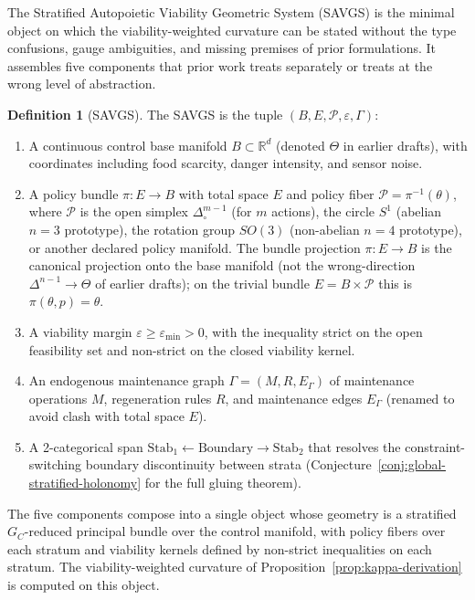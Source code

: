 \documentclass[11pt,a4paper]{article}
\theoremstyle{plain}
\theoremstyle{definition}
\newtheorem{definition}[theorem]{Definition}
\theoremstyle{remark}
\newcommand{\RR}{\mathbb{R}}
\newcommand{\Stab}{\mathrm{Stab}}
\begin{document}
The Stratified Autopoietic Viability Geometric System (SAVGS) is the
minimal object on which the viability-weighted curvature can be stated
without the type confusions, gauge ambiguities, and missing premises of
prior formulations. It assembles five components that prior work treats
separately or treats at the wrong level of abstraction.

\begin{definition}[SAVGS]
\label{def:savgs}
The SAVGS is the tuple $(B, E, \mathcal P, \varepsilon, \Gamma)$:
\begin{enumerate}[leftmargin=*,itemsep=2pt]
\item A continuous control base manifold $B \subset \RR^d$ (denoted
$\Theta$ in earlier drafts), with coordinates including food
scarcity, danger intensity, and sensor noise.
\item A policy bundle $\pi : E \to B$ with total space $E$ and policy
fiber $\mathcal P = \pi^{-1}(\theta)$, where $\mathcal P$ is the open
simplex $\Delta^{m-1}_\circ$ (for $m$ actions), the circle $S^1$
(abelian $n=3$ prototype), the rotation group $SO(3)$ (non-abelian
$n=4$ prototype), or another declared policy manifold. The bundle
projection $\pi : E \to B$ is the canonical projection onto the base
manifold (not the wrong-direction $\Delta^{n-1} \to \Theta$ of earlier
drafts); on the trivial bundle $E = B \times \mathcal P$ this is
$\pi(\theta, p) = \theta$.
\item A viability margin $\varepsilon\geq\varepsilon_{\min}>0$, with
the inequality strict on the open feasibility set and non-strict on the
closed viability kernel.
\item An endogenous maintenance graph $\Gamma=(M, R, E_\Gamma)$ of
maintenance operations $M$, regeneration rules $R$, and maintenance
edges $E_\Gamma$ (renamed to avoid clash with total space $E$).
\item A 2-categorical span $\Stab_1\leftarrow\mathrm{Boundary}\rightarrow
\Stab_2$ that resolves the constraint-switching boundary discontinuity
between strata (Conjecture~\ref{conj:global-stratified-holonomy} for
the full gluing theorem).
\end{enumerate}
\end{definition}

The five components compose into a single object whose geometry is a
stratified $G_C$-reduced principal bundle over the control manifold, with
policy fibers over each stratum and viability kernels defined by
non-strict inequalities on each stratum. The viability-weighted
curvature of Proposition~\ref{prop:kappa-derivation} is computed on this
object.
\end{document}
